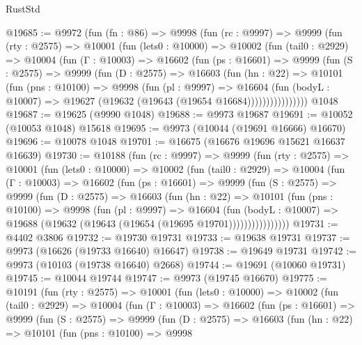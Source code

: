 \begin{lexlean}{RustStd}
\begin{coremodule}
@19685 := @9972
    (fun (fn : @86) =>
    @9998
      (fun (rc : @9997) =>
      @9999
        (fun (rty : @2575) =>
        @10001
          (fun (lets0 : @10000) =>
          @10002
            (fun (tail0 : @2929) =>
            @10004
              (fun (Γ : @10003) =>
              @16602
                (fun (ps : @16601) =>
                @9999
                  (fun (S : @2575) =>
                  @9999
                    (fun (D : @2575) =>
                    @16603
                      (fun (hn : @22) =>
                      @10101
                        (fun (pns : @10100) =>
                        @9998
                          (fun (pl : @9997) =>
                          @16604
                            (fun (bodyL : @10007) =>
                            @19627 (@19632 (@19643 (@19654 @16684))))))))))))))))
    @1048
@19687 := @19625 (@9990 @1048)
@19688 := @9973 @19687
@19691 := @10052 (@10053 @1048) @15618
@19695 := @9973 (@10044 (@19691 @16666) @16670)
@19696 := @10078 @1048
@19701 := @16675 (@16676 @19696 @15621 @16637 @16639)
@19730 := @10188
    (fun (rc : @9997) =>
    @9999
      (fun (rty : @2575) =>
      @10001
        (fun (lets0 : @10000) =>
        @10002
          (fun (tail0 : @2929) =>
          @10004
            (fun (Γ : @10003) =>
            @16602
              (fun (ps : @16601) =>
              @9999
                (fun (S : @2575) =>
                @9999
                  (fun (D : @2575) =>
                  @16603
                    (fun (hn : @22) =>
                    @10101
                      (fun (pns : @10100) =>
                      @9998
                        (fun (pl : @9997) =>
                        @16604
                          (fun (bodyL : @10007) =>
                          @19688 (@19632 (@19643 (@19654 (@19695 @19701))))))))))))))))
@19731 := @4402 @3806
@19732 := @19730 @19731
@19733 := @19638 @19731
@19737 := @9973 (@16626 (@19733 @16640) @16647)
@19738 := @19649 @19731
@19742 := @9973 (@10103 (@19738 @16640) @2668)
@19744 := @19691 (@10060 @19731)
@19745 := @10044 @19744
@19747 := @9973 (@19745 @16670)
@19775 := @10191
    (fun (rty : @2575) =>
    @10001
      (fun (lets0 : @10000) =>
      @10002
        (fun (tail0 : @2929) =>
        @10004
          (fun (Γ : @10003) =>
          @16602
            (fun (ps : @16601) =>
            @9999
              (fun (S : @2575) =>
              @9999
                (fun (D : @2575) =>
                @16603
                  (fun (hn : @22) =>
                  @10101
                    (fun (pns : @10100) =>
                    @9998

\end{coremodule}
\end{lexlean}
